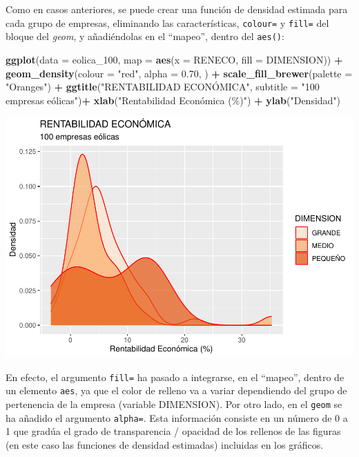 \documentclass[
]{book}
\newenvironment{Shaded}{\begin{snugshade}}{\end{snugshade}}
\newcommand{\AttributeTok}[1]{\textcolor[rgb]{0.13,0.29,0.53}{#1}}
\newcommand{\FloatTok}[1]{\textcolor[rgb]{0.00,0.00,0.81}{#1}}
\newcommand{\FunctionTok}[1]{\textcolor[rgb]{0.13,0.29,0.53}{\textbf{#1}}}
\newcommand{\NormalTok}[1]{#1}
\newcommand{\SpecialCharTok}[1]{\textcolor[rgb]{0.81,0.36,0.00}{\textbf{#1}}}
\newcommand{\StringTok}[1]{\textcolor[rgb]{0.31,0.60,0.02}{#1}}
\let\Oldincludegraphics\includegraphics
\renewcommand{\includegraphics}[2][]{%
  \Oldincludegraphics[#1]{#2}%
}
\begin{document}
Como en casos anteriores, se puede crear una función de densidad estimada para cada grupo de empresas, eliminando las características, \texttt{colour=} y \texttt{fill=} del bloque del \emph{geom}, y añadiéndolas en el ``mapeo'', dentro del \texttt{aes()}:

\begin{Shaded}
\begin{Highlighting}[]
\FunctionTok{ggplot}\NormalTok{(}\AttributeTok{data =}\NormalTok{ eolica\_100, }\AttributeTok{map =} \FunctionTok{aes}\NormalTok{(}\AttributeTok{x =}\NormalTok{ RENECO, }\AttributeTok{fill =}\NormalTok{ DIMENSION)) }\SpecialCharTok{+}
  \FunctionTok{geom\_density}\NormalTok{(}\AttributeTok{colour =} \StringTok{"red"}\NormalTok{, }\AttributeTok{alpha =} \FloatTok{0.70}\NormalTok{, ) }\SpecialCharTok{+}
  \FunctionTok{scale\_fill\_brewer}\NormalTok{(}\AttributeTok{palette =} \StringTok{"Oranges"}\NormalTok{) }\SpecialCharTok{+}
  \FunctionTok{ggtitle}\NormalTok{(}\StringTok{"RENTABILIDAD ECONÓMICA"}\NormalTok{, }\AttributeTok{subtitle =} \StringTok{"100 empresas eólicas"}\NormalTok{)}\SpecialCharTok{+}
  \FunctionTok{xlab}\NormalTok{(}\StringTok{"Rentabilidad Económica (\%)"}\NormalTok{) }\SpecialCharTok{+}
  \FunctionTok{ylab}\NormalTok{(}\StringTok{"Densidad"}\NormalTok{)}
\end{Highlighting}
\end{Shaded}

\includegraphics{_main_files/figure-latex/unnamed-chunk-112-1.pdf}

En efecto, el argumento \texttt{fill=} ha pasado a integrarse, en el ``mapeo'', dentro de un elemento \texttt{aes}, ya que el color de relleno va a variar dependiendo del grupo de pertenencia de la empresa (variable DIMENSION). Por otro lado, en el \texttt{geom} se ha añadido el argumento \texttt{alpha=}. Esta información consiste en un número de 0 a 1 que gradúa el grado de transparencia / opacidad de los rellenos de las figuras (en este caso las funciones de densidad estimadas) incluidas en los gráficos.
\end{document}

